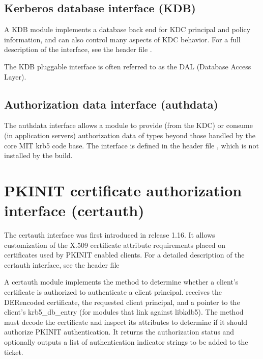 \documentclass[letterpaper,10pt,english]{sphinxmanual}
\begin{document}
\subsection{Kerberos database interface (KDB)}
\label{\detokenize{plugindev/internal:kerberos-database-interface-kdb}}
\sphinxAtStartPar
A KDB module implements a database back end for KDC principal and
policy information, and can also control many aspects of KDC behavior.
For a full description of the interface, see the header file
.

\sphinxAtStartPar
The KDB pluggable interface is often referred to as the DAL (Database
Access Layer).


\subsection{Authorization data interface (authdata)}
\label{\detokenize{plugindev/internal:authorization-data-interface-authdata}}
\sphinxAtStartPar
The authdata interface allows a module to provide (from the KDC) or
consume (in application servers) authorization data of types beyond
those handled by the core MIT krb5 code base.  The interface is
defined in the header file , which is not
installed by the build.


\section{PKINIT certificate authorization interface (certauth)}
\label{\detokenize{plugindev/certauth:pkinit-certificate-authorization-interface-certauth}}\label{\detokenize{plugindev/certauth:certauth-plugin}}\label{\detokenize{plugindev/certauth::doc}}
\sphinxAtStartPar
The certauth interface was first introduced in release 1.16.  It
allows customization of the X.509 certificate attribute requirements
placed on certificates used by PKINIT enabled clients.  For a detailed
description of the certauth interface, see the header file

\sphinxAtStartPar
A certauth module implements the  method to determine
whether a client’s certificate is authorized to authenticate a client
principal.   receives the DER\sphinxhyphen{}encoded certificate, the
requested client principal, and a pointer to the client’s
krb5\_db\_entry (for modules that link against libkdb5).  The method
must decode the certificate and inspect its attributes to determine if
it should authorize PKINIT authentication.  It returns the
authorization status and optionally outputs a list of authentication
indicator strings to be added to the ticket.
\end{document}
